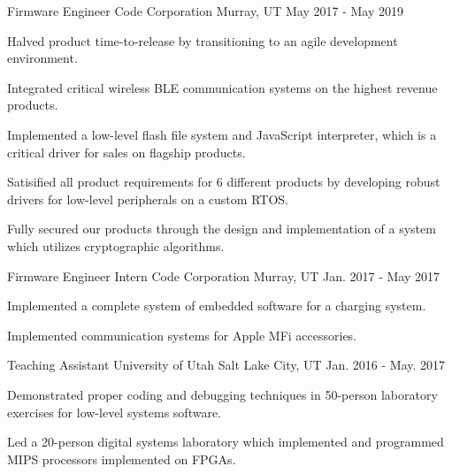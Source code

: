\begin{cventries}
\cventry
{Firmware Engineer} %
{Code Corporation} %
{Murray, UT} %
{May 2017 - May 2019} %
{ %
\begin{cvitems}
\item Halved product time-to-release by transitioning to an agile development environment.
\item Integrated critical wireless BLE communication systems on the highest revenue products.
\item Implemented a low-level flash file system and JavaScript interpreter, which is a critical driver for sales on flagship products.
\item Satisified all product requirements for 6 different products by developing robust drivers for low-level peripherals on a custom RTOS.
\item Fully secured our products through the design and implementation of a system which utilizes cryptographic algorithms.
\end{cvitems}
}


\cventry
{Firmware Engineer Intern} %
{Code Corporation} %
{Murray, UT} %
{Jan. 2017 - May 2017} %
{ %
\begin{cvitems}
\item Implemented a complete system of embedded software for a charging system.
\item Implemented communication systems for Apple MFi accessories.
\end{cvitems}
}


\cventry
{Teaching Assistant} %
{University of Utah} %
{Salt Lake City, UT} %
{Jan. 2016 - May. 2017} %
{ %
\begin{cvitems}
\item Demonstrated proper coding and debugging techniques in 50-person laboratory exercises for low-level systems software.
\item Led a 20-person digital systems laboratory which implemented and programmed MIPS processors implemented on FPGAs.
\end{cvitems}
}



\end{cventries}
